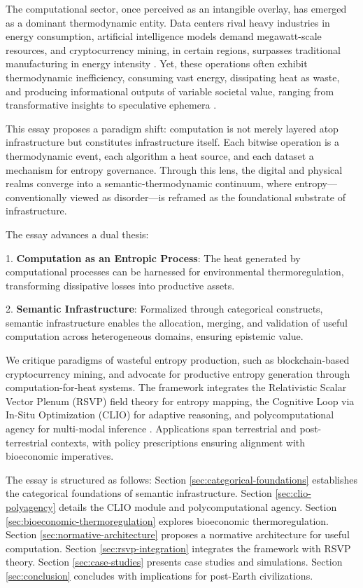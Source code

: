 \documentclass[12pt]{article}
\begin{document}
The computational sector, once perceived as an intangible overlay, has emerged as a dominant thermodynamic entity. Data centers rival heavy industries in energy consumption, artificial intelligence models demand megawatt-scale resources, and cryptocurrency mining, in certain regions, surpasses traditional manufacturing in energy intensity \citep{Markov2014, DeVries2021}. Yet, these operations often exhibit thermodynamic inefficiency, consuming vast energy, dissipating heat as waste, and producing informational outputs of variable societal value, ranging from transformative insights to speculative ephemera \citep{Landauer1961}.

This essay proposes a paradigm shift: computation is not merely layered atop infrastructure but constitutes infrastructure itself. Each bitwise operation is a thermodynamic event, each algorithm a heat source, and each dataset a mechanism for entropy governance. Through this lens, the digital and physical realms converge into a semantic-thermodynamic continuum, where entropy—conventionally viewed as disorder—is reframed as the foundational substrate of infrastructure.

The essay advances a dual thesis:

1. \textbf{Computation as an Entropic Process}: The heat generated by computational processes can be harnessed for environmental thermoregulation, transforming dissipative losses into productive assets.

2. \textbf{Semantic Infrastructure}: Formalized through categorical constructs, semantic infrastructure enables the allocation, merging, and validation of useful computation across heterogeneous domains, ensuring epistemic value.

We critique paradigms of wasteful entropy production, such as blockchain-based cryptocurrency mining, and advocate for productive entropy generation through computation-for-heat systems. The framework integrates the Relativistic Scalar Vector Plenum (RSVP) field theory for entropy mapping, the Cognitive Loop via In-Situ Optimization (CLIO) for adaptive reasoning, and polycomputational agency for multi-modal inference \citep{ChengBroadbentChappell2025, Shulman2012, AbramskyCoecke2004}. Applications span terrestrial and post-terrestrial contexts, with policy prescriptions ensuring alignment with bioeconomic imperatives.

The essay is structured as follows: Section \ref{sec:categorical-foundations} establishes the categorical foundations of semantic infrastructure. Section \ref{sec:clio-polyagency} details the CLIO module and polycomputational agency. Section \ref{sec:bioeconomic-thermoregulation} explores bioeconomic thermoregulation. Section \ref{sec:normative-architecture} proposes a normative architecture for useful computation. Section \ref{sec:rsvp-integration} integrates the framework with RSVP theory. Section \ref{sec:case-studies} presents case studies and simulations. Section \ref{sec:conclusion} concludes with implications for post-Earth civilizations.
\end{document}
